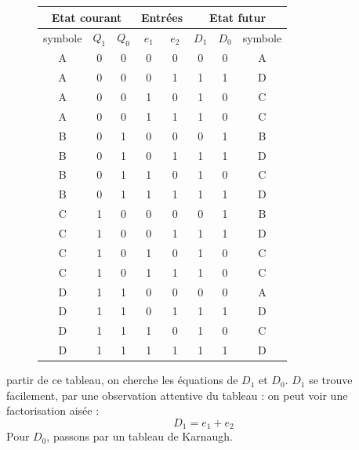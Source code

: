 \documentclass[a4paper,11pt]{article}
\begin{document}
\begin{figure}
\begin{center}
      \begin{tabular}{|c|c|c|c|c||c|c|c|}
          \hline
          \multicolumn{3}{|c|}{Etat courant} & \multicolumn{2}{c||}{Entrées} & \multicolumn{3}{c|}{Etat futur} \\ \hline
          symbole  & $Q_1$ & $Q_0$ & $e_1$ & $e_2$ & $D_1$ & $D_0$ & symbole  \\ \hline \hline
          A & 0 & 0 & 0 & 0 & 0 & 0  & A \\ \hline
          A & 0 & 0 & 0 & 1 & 1 & 1 & D  \\ \hline
          A & 0 & 0 & 1 & 0 & 1 & 0 & C\\ \hline
          A & 0 & 0 & 1 & 1 & 1 & 0 & C\\ \hline \hline
          B & 0 & 1 & 0 & 0 & 0 & 1  & B\\ \hline
          B & 0 & 1 & 0 & 1 & 1 & 1  & D\\ \hline
          B & 0 & 1 & 1 & 0 & 1 & 0  & C\\ \hline
          B & 0 & 1 & 1 & 1 & 1 & 1  & D\\ \hline \hline
          C & 1 & 0 & 0 & 0 & 0 & 1  & B\\ \hline
          C & 1 & 0 & 0 & 1 & 1 & 1  & D\\ \hline
          C & 1 & 0 & 1 & 0 & 1 & 0  & C\\ \hline
          C & 1 & 0 & 1 & 1 & 1 & 0  & C\\ \hline \hline
          D & 1 & 1 & 0 & 0 & 0 & 0  & A\\ \hline
          D & 1 & 1 & 0 & 1 & 1 & 1  & D\\ \hline
          D & 1 & 1 & 1 & 0 & 1 & 0  & C\\ \hline
          D & 1 & 1 & 1 & 1 & 1 & 1  & D\\ \hline
      \end{tabular}
\end{center}
\end{figure}
partir de ce tableau, on cherche les équations de $D_1$ et $D_0$. $D_1$ se trouve facilement, par une observation attentive du tableau : on peut voir une factorisation aisée :
$$D_1=e_1+e_2$$
Pour $D_0$, passons par un tableau de Karnaugh.
\end{document}
